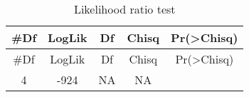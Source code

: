 \documentclass[11pt,]{article}
\begin{document}
\begin{longtable}[]{@{}ccccc@{}}
\caption{Likelihood ratio test}\tabularnewline
\toprule
\begin{minipage}[b]{0.07\columnwidth}\centering\strut
\#Df\strut
\end{minipage} & \begin{minipage}[b]{0.11\columnwidth}\centering\strut
LogLik\strut
\end{minipage} & \begin{minipage}[b]{0.06\columnwidth}\centering\strut
Df\strut
\end{minipage} & \begin{minipage}[b]{0.10\columnwidth}\centering\strut
Chisq\strut
\end{minipage} & \begin{minipage}[b]{0.14\columnwidth}\centering\strut
Pr(\textgreater{}Chisq)\strut
\end{minipage}\tabularnewline
\midrule
\endfirsthead
\toprule
\begin{minipage}[b]{0.07\columnwidth}\centering\strut
\#Df\strut
\end{minipage} & \begin{minipage}[b]{0.11\columnwidth}\centering\strut
LogLik\strut
\end{minipage} & \begin{minipage}[b]{0.06\columnwidth}\centering\strut
Df\strut
\end{minipage} & \begin{minipage}[b]{0.10\columnwidth}\centering\strut
Chisq\strut
\end{minipage} & \begin{minipage}[b]{0.14\columnwidth}\centering\strut
Pr(\textgreater{}Chisq)\strut
\end{minipage}\tabularnewline
\midrule
\endhead
\begin{minipage}[t]{0.07\columnwidth}\centering\strut
4\strut
\end{minipage} & \begin{minipage}[t]{0.11\columnwidth}\centering\strut
-924\strut
\end{minipage} & \begin{minipage}[t]{0.06\columnwidth}\centering\strut
NA\strut
\end{minipage} & \begin{minipage}[t]{0.10\columnwidth}\centering\strut
NA\strut
\end{minipage} & \begin{minipage}[t]{0.14\columnwidth}\centering\strut

\end{minipage}
\end{longtable}
\end{document}
